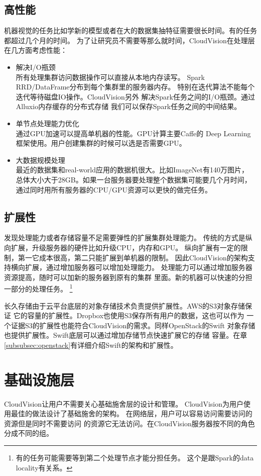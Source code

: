 \subsection{高性能}
机器视觉的任务比如学新的模型或者在大的数据集抽特征需要很长时间。有的任务都超过几个月的时间。
为了让研究员不需要等那么就时间，CloudVision在处理层在几方面考虑性能：
\begin{itemize}
  \item 解决I/O瓶颈 \\
        所有处理集群访问数据操作可以直接从本地内存读写。
        Spark RRD/DataFrame分布到每个集群里的服务器内存。
        特别在迭代算法不能每个迭代等待磁盘IO操作。CloudVision另外
        解决Spark任务之间的I/O瓶颈。通过Alluxio内存缓存的分布式存储
        我们可以保存Spark任务之间的中间结果。
  \item 单节点处理能力优化 \\
        通过GPU加速可以提高单机器的性能。GPU计算主要Caffe的
        Deep Learning框架使用。用户创建集群的时候可以选是否需要GPU。
  \item 大数据规模处理 \\
        最近的数据集和real-world应用的数据机很大。比如ImageNet有140万图片，
        总体大小大于28GB。如果一台服务器要处理整个数据集可能要几个月时间，
        通过同时用所有服务器的CPU/GPU资源可以更快的做完任务。
\end{itemize}

\subsection{扩展性}
发现处理能力或者存储容量不足需要弹性的扩展集群处理能力。
传统的方式是纵向扩展，升级服务器的硬件比如升级CPU，内存和GPU。
纵向扩展有一定的限制，第一它成本很高，第二只能扩展到单机器的限制。
因此CloudVision的架构支持横向扩展，通过增加服务器可以增加处理能力。
处理能力可以通过增加服务器资源提高，随时可以加新的服务器到原有的集群
里面。新的机器可以快速的分担一部分的处理任务。
\footnote{有的任务可能需要等到第二个处理节点才能分担任务。
这个是跟Spark的data locality有关系。}

长久存储由于云平台底层的对象存储技术负责提供扩展性。AWS的S3对象存储保证
它的容量的扩展性。Dropbox也使用S3保存所有用户的数据，这也可以作为
一个证据S3的扩展性也能符合CloudVision的需求。同样OpenStack的Swift
对象存储也提供扩展性。Swift底层可以通过增加存储节点快速扩展它的存储
容量。在章\ref{subsubsec:openstack}有详细介绍Swift的架构和扩展性。

\section{基础设施层}
\label{sec:arch_infra}
CloudVision让用户不需要关心基础施舍层的设计和管理。
CloudVision为用户使用最佳的做法设计了基础施舍的架构。
在网络层，用户可以容易访问需要访问的资源但是同时不需要访问
的资源它无法访问。在CloudVision服务器按不同的角色分成不同的组。

